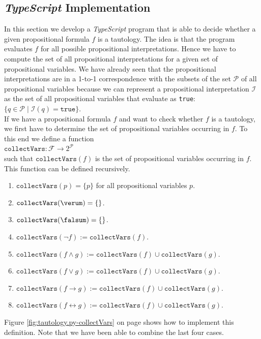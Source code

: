 \subsection{\textsl{TypeScript} Implementation}
In this section we develop a \textsl{TypeScript} program that is able to decide whether a given propositional
formula $f$ is a tautology.  The idea is that the program evaluates $f$ for all possible propositional
interpretations.  Hence we have to compute the set of all propositional interpretations for a given set of
propositional variables.  We have already seen that the propositional interpretations are in a 1-to-1
correspondence with the subsets of the set $\mathcal{P}$ of all propositional variables because we can
represent a propositional interpretation $\mathcal{I}$ as the set of all propositional variables that evaluate
as \texttt{true}:
\\[0.2cm]
\hspace*{1.3cm}
$\bigl\{ q \in \mathcal{P} \mid \mathcal{I}(q) = \mathtt{true} \bigr\}$.
\\[0.2cm]
If we have a propositional formula $f$ and want to check whether $f$ is a tautology, we first have to determine
the set of propositional variables occurring in $f$.
To this end we define a function
\\[0.2cm]
\hspace*{1.3cm}
$\texttt{collectVars}: \mathcal{F} \rightarrow 2^{\mathcal{P}}$
\\[0.2cm]
such that $\mathtt{collectVars}(f)$ is the set of propositional variables occurring in $f$.  This function can
be defined recursively.
\begin{enumerate}
\item $\mathtt{collectVars}(p) = \{ p \}$ \quad for all propositional variables $p$.
\item $\mathtt{collectVars}(\verum) = \{\}$.
\item $\mathtt{collectVars}(\falsum) = \{\}$.
\item $\mathtt{collectVars}(\neg f) := \mathtt{collectVars}(f)$.
\item $\mathtt{collectVars}(f \wedge g) := \mathtt{collectVars}(f) \cup \mathtt{collectVars}(g)$.
\item $\mathtt{collectVars}(f \vee g) := \mathtt{collectVars}(f) \cup \mathtt{collectVars}(g)$.
\item $\mathtt{collectVars}(f \rightarrow g) := \mathtt{collectVars}(f) \cup \mathtt{collectVars}(g)$.
\item $\mathtt{collectVars}(f \leftrightarrow g) := \mathtt{collectVars}(f) \cup \mathtt{collectVars}(g)$.
\end{enumerate}
Figure \ref{fig:tautology.py-collectVars} on page \pageref{fig:tautology.py-collectVars} shows how to implement
this definition.  Note that we have been able to combine the last four cases.

